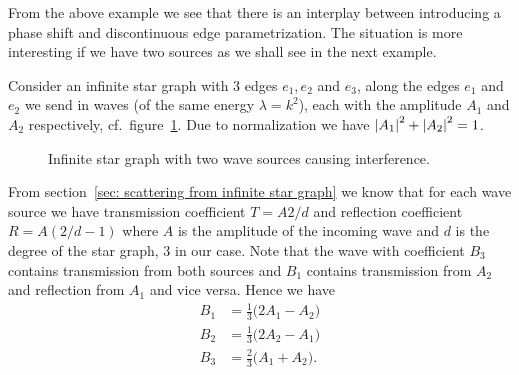 From the above example we see that there is an interplay between introducing a phase shift and discontinuous edge parametrization. The situation is more interesting if we have two sources as we shall see in the next example.

\begin{example}
  Consider an infinite star graph with 3 edges $e_1, e_2$ and $e_3$, along the edges $e_1$ and $e_2$ we send in waves (of the same energy $\lambda = k^2$), each with the amplitude $A_1$ and $A_2$ respectively, cf.\ figure~\ref{fig: infinite star graph interference}. Due to normalization we have $\left\lvert A_1\right\rvert^2+\left\lvert A_2\right\rvert^2=1$.
  \begin{figure}[h]
    \centering
    \caption{Infinite star graph with two wave sources causing interference.}
    \label{fig: infinite star graph interference}
  \end{figure}
  From section~\ref{sec: scattering from infinite star graph} we know that for each wave source we have transmission coefficient $T=A2/d$ and reflection coefficient $R=A(2/d-1)$ where $A$ is the amplitude of the incoming wave and $d$ is the degree of the star graph, 3 in our case. Note that the wave with coefficient $B_3$ contains transmission from both sources and $B_1$ contains transmission from $A_2$ and reflection from $A_1$ and vice versa. Hence we have
  \begin{align*}
    B_1 &= \frac{1}{3}\big(2A_1-A_2\big) \\
    B_2 &= \frac{1}{3}\big(2A_2-A_1\big) \\
    B_3 &= \frac{2}{3}\big(A_1+A_2\big).
  \end{align*}


\end{example}
